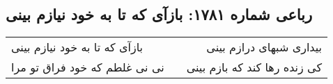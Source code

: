 \begin{center}
\section*{رباعی شماره ۱۷۸۱: بازآی که تا به خود نیازم بینی}
\label{sec:1781}
\begin{longtable}{l p{0.5cm} r}
بازآی که تا به خود نیازم بینی
&&
بیداری شبهای درازم بینی
\\
نی نی غلطم که خود فراق تو مرا
&&
کی زنده رها کند که بازم بینی
\\
\end{longtable}
\end{center}
